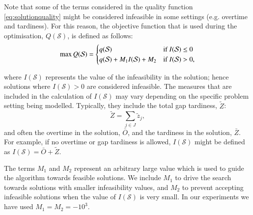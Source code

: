 \documentclass[a4paper,11pt,authoryear]{elsarticle}
\begin{document}
\noindent Note that some of the terms considered in the quality function \eqref{eq:solutionquality} might be considered infeasible in some settings (e.g. overtime and tardiness). For this reason, the objective function that is used during the optimisation, $Q(\mathcal{S})$, is defined as follows:
\begin{equation}
  \max Q(\mathcal{S}) =
  \begin{cases}
   q(\ensuremath{\mathcal{S}}) & \text{if \ensuremath{I(\mathcal{S}) \leq 0}} \\
   q(\ensuremath{\mathcal{S}}) + \ensuremath{M_1 I(\mathcal{S})} + \ensuremath{M_2} & \text{if \ensuremath{I(\mathcal{S}) > 0}}, \label{eq:realobjfunction}
  \end{cases}
\end{equation}

\noindent where $I(\mathcal{S})$ represents the value of the infeasibility in the solution; hence solutions where $I(\mathcal{S}) > 0$ are considered infeasible. The measures that are included in the calculation of $I(\mathcal{S})$ may vary depending on the specific problem setting being modelled. Typically, they include the total gap tardiness, $\tilde{Z}$:
\begin{equation}
    \tilde{Z} = \sum_{j \in J} \tilde{z}_j, \label{eq:totalgaptardiness}
\end{equation}
 and often the overtime in the solution, $\bar{O}$, and the tardiness in the solution, $\bar{Z}$. For example, if no overtime or gap tardiness is allowed, $I(\mathcal{S})$ might be defined as $I(\mathcal{S}) = \bar{O} + \tilde{Z}$.

The terms $M_1$ and $M_2$ represent an arbitrary large value which is used to guide the algorithm towards feasible solutions. We include $M_1$ to drive the search towards solutions with smaller infeasibility values, and $M_2$ to prevent accepting infeasible solutions when the value of $I(\mathcal{S})$ is very small. In our experiments we have used $M_1 = M_2 = -10^3$.

\end{document}
